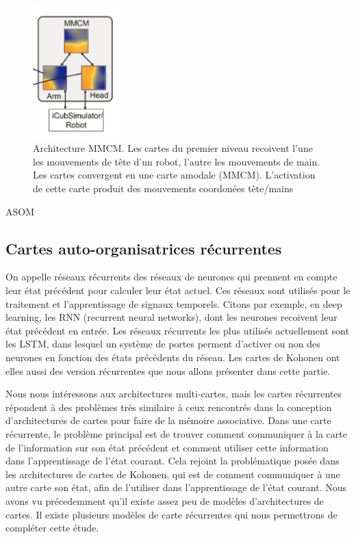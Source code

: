 \documentclass[../main]{subfiles}
\begin{document}
\begin{figure}
    \centering
    \includegraphics[width=0.3\textwidth]{MMCM_schema.pdf}
    \caption{Architecture MMCM. Les cartes du premier niveau recoivent l'une les mouvements de tête d'un robot, l'autre les mouvements de main. Les cartes convergent en une carte amodale (MMCM). L'activation de cette carte produit des mouvements coordonées tête/mains~\cite{dominey13}\label{fig:mmcm}}
\end{figure}

ASOM
\cite{johnsson_associating_2008}


\subsection{Cartes auto-organisatrices récurrentes}

On appelle réseaux récurrents des réseaux de neurones qui prennent en compte leur état précédent pour calculer leur état actuel. Ces réseaux sont utilisés pour le traitement et l'apprentissage de signaux temporels. Citons par exemple, en deep learning, les RNN (recurrent neural networks), dont les neurones recoivent leur état précédent en entrée. Les réseaux récurrents les plus utilisés actuellement sont les LSTM, dans lesquel un système de portes perment d'activer ou non des neurones en fonction des états précédents du réseau. Les cartes de Kohonen ont elles aussi des version récurrentes que nous allons présenter dans cette partie.

Nous nous intéressons aux architectures multi-cartes, mais les cartes récurrentes répondent à des problèmes très similaire à ceux rencontrés dans la conception d'architectures de cartes pour faire de la mémoire associative. Dans une carte récurrente, le problème principal est de trouver comment communiquer à la carte de l'information sur son état précédent et comment utiliser cette information dans l'apprentissage de l'état courant. Cela rejoint la problématique posée dans les architectures de cartes de Kohonen, qui est de comment communiquer à une autre carte son état, afin de l'utiliser dans l'apprentissage de l'état courant. Nous avons vu précedemment qu'il existe assez peu de modèles d'architectures de cartes. Il existe plusieurs modèles de carte récurrentes qui nous permettrons de compléter cette étude. 
\end{document}
